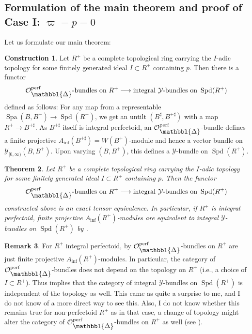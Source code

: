 \documentclass[10pt,twoside]{article}
\numberwithin{equation}{section}
\theoremstyle{plain}
\newtheorem{mythm}{Theorem}[section]
\theoremstyle{definition}
\newtheorem{myrem}[mythm]{Remark}
\newtheorem{myconst}[mythm]{Construction}
\DeclareMathOperator{\Spa}{Spa}
\DeclareMathOperator{\Spd}{Spd}
\newcommand{\MCO}{\mathcal{O}}
\newcommand{\MCY}{\mathcal{Y}}
\DeclareMathOperator{\perf}{perf}
\newcommand{\Prism}{{\mathlarger{\mathbbl{\Delta}}}}
\DeclareMathOperator{\Inf}{inf}
\newcommand{\Ainf}{A_{\Inf}}
\newcommand{\Yco}{\MCY_{[0,\infty)}}
\newcommand{\OpP}{\MCO^{\perf}_{\Prism}}
\begin{document}
\subsection{\texorpdfstring{Formulation of the main theorem and proof of Case I: \(\varpi = p = 0\)}
  {Formulation of the main theorem and proof of Case I: ϖ=p=0}}
Let us formulate our main theorem:

\begin{myconst}\label{equivalenceConst}
Let \(R^+\) be a complete topological ring carrying the \(I\)-adic topology for some finitely generated ideal \(I\subset R^+\) containing \(p\). Then there is a functor 
\[\text{\(\OpP\)-bundles on } R^+
\longrightarrow\text{integral \(\MCY\)-bundles on }\Spd(R^+)\]
defined as follows: For any map from a representable \(\Spa(B,B^+)\to \Spd(R^+)\), we get an untilt \((B^\sharp,B^{+\sharp})\) with a map \(R^+ \to B^{+\sharp}\). As \(B^{+\sharp}\) itself is integral perfectoid, an \(\OpP\)-bundle defines a finite projective \(\Ainf(B^{+\sharp})=W(B^+)\)-module and hence a vector bundle on \(\Yco(B,B^+)\).
Upon varying \((B,B^+)\), this defines a \(\MCY\)-bundle on \(\Spd(R^+)\).
\end{myconst}

\begin{mythm}\label{equivalenceThm}
Let \(R^+\) be a complete topological ring carrying the \(I\)-adic topology for some finitely generated ideal \(I\subset R^+\) containing \(p\). Then the functor
\[\text{\emph{\(\OpP\)-bundles on }} R^+
\longrightarrow\text{\emph{integral \(\MCY\)-bundles on }}\Spd(R^+)\]
constructed above is an exact tensor equivalence. In particular, if \(R^+\) is integral perfectoid, finite projective \(\Ainf(R^+)\)-modules are equivalent to integral \(\MCY\)-bundles on \(\Spd(R^+)\) by .
\end{mythm}

\begin{myrem}\label{equivalenceTheoremRemark}
For \(R^+\) integral perfectoid, by  \(\OpP\)-bundles on \(R^+\) are just finite projective \(\Ainf(R^+)\)-modules. In particular, the category of \(\OpP\)-bundles does not depend on the topology on \(R^+\) (i.e., a choice of \(I\subset R^+\)). Thus  implies that the category of integral \(\MCY\)-bundles on \(\Spd(R^+)\) is independent of the topology as well. This came as quite a surprise to me, and I do not know of a more direct way to see this. Also, I do not know whether this remains true for non-perfectoid \(R^+\) as in that case, a change of topology might alter the category of \(\OpP\)-bundles on \(R^+\) as well (see ).
\end{myrem}
\end{document}
